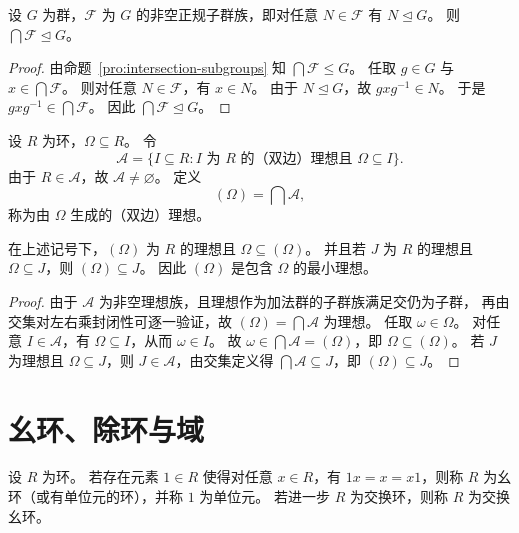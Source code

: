 \documentclass[lang=cn,a4paper,newtx]{elegantbook}
\begin{document}
\begin{proposition}
设 $G$ 为群，$\mathcal F$ 为 $G$ 的非空正规子群族，即对任意 $N\in \mathcal F$ 有 $N\trianglelefteq G$。
则 $\bigcap\mathcal F\trianglelefteq G$。
\end{proposition}

\begin{proof}
由命题~\ref{pro:intersection-subgroups} 知 $\bigcap\mathcal F\le G$。
任取 $g\in G$ 与 $x\in \bigcap\mathcal F$。
则对任意 $N\in \mathcal F$，有 $x\in N$。
由于 $N\trianglelefteq G$，故 $gxg^{-1}\in N$。
于是 $gxg^{-1}\in \bigcap\mathcal F$。
因此 $\bigcap\mathcal F\trianglelefteq G$。
\end{proof}

\begin{definition}[生成理想]
设 $R$ 为环，$\Omega\subseteq R$。
令
\[
  \mathcal A=\{I\subseteq R: I\text{ 为 }R\text{ 的（双边）理想且 }\Omega\subseteq I\}.
\]
由于 $R\in \mathcal A$，故 $\mathcal A\neq\varnothing$。
定义
\[
  (\Omega)=\bigcap\mathcal A,
\]
称为由 $\Omega$ 生成的（双边）理想。
\end{definition}

\begin{proposition}
在上述记号下，$(\Omega)$ 为 $R$ 的理想且 $\Omega\subseteq (\Omega)$。
并且若 $J$ 为 $R$ 的理想且 $\Omega\subseteq J$，则 $(\Omega)\subseteq J$。
因此 $(\Omega)$ 是包含 $\Omega$ 的最小理想。
\end{proposition}

\begin{proof}
由于 $\mathcal A$ 为非空理想族，且理想作为加法群的子群族满足交仍为子群，
再由交集对左右乘封闭性可逐一验证，故 $(\Omega)=\bigcap\mathcal A$ 为理想。
任取 $\omega\in \Omega$。
对任意 $I\in \mathcal A$，有 $\Omega\subseteq I$，从而 $\omega\in I$。
故 $\omega\in \bigcap\mathcal A=(\Omega)$，即 $\Omega\subseteq (\Omega)$。
若 $J$ 为理想且 $\Omega\subseteq J$，则 $J\in \mathcal A$，由交集定义得 $\bigcap\mathcal A\subseteq J$，即 $(\Omega)\subseteq J$。
\end{proof}

\section{幺环、除环与域}

\begin{definition}[幺环与交换幺环]
设 $R$ 为环。
若存在元素 $1\in R$ 使得对任意 $x\in R$，有 $1x=x=x1$，则称 $R$ 为幺环（或有单位元的环），并称 $1$ 为单位元。
若进一步 $R$ 为交换环，则称 $R$ 为交换幺环。
\end{definition}
\end{document}
